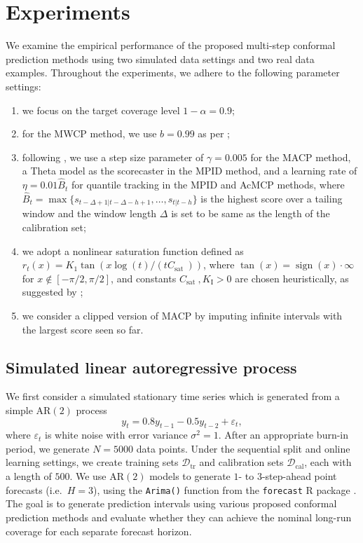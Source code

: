 \documentclass[
  11pt,
  12pt]{article}
\providecommand{\tightlist}{%
  \setlength{\itemsep}{0pt}\setlength{\parskip}{0pt}}\usepackage{longtable,booktabs,array}
\theoremstyle{plain}
\theoremstyle{remark}
\begin{document}
\section{Experiments}\label{experiments}

We examine the empirical performance of the proposed multi-step
conformal prediction methods using two simulated data settings and two
real data examples. Throughout the experiments, we adhere to the
following parameter settings:

\begin{enumerate}
\def\labelenumi{(\alph{enumi})}
\tightlist
\item
  we focus on the target coverage level \(1-\alpha=0.9\);
\item
  for the MWCP method, we use \(b=0.99\) as per \citet{barber2023};
\item
  following \citet{angelopoulos2024}, we use a step size parameter of
  \(\gamma=0.005\) for the MACP method, a Theta model as the scorecaster
  in the MPID method, and a learning rate of \(\eta=0.01\hat{B}_t\) for
  quantile tracking in the MPID and AcMCP methods, where
  \(\hat{B}_t=\max\{s_{t-\Delta+1|t-\Delta-h+1},\dots,s_{t|t-h}\}\) is
  the highest score over a tailing window and the window length
  \(\Delta\) is set to be same as the length of the calibration set;
\item
  we adopt a nonlinear saturation function defined as
  \(r_t(x)=K_1 \tan \left(x \log (t) / (t C_{\text {sat }})\right)\),
  where \(\tan (x)=\operatorname{sign}(x) \cdot \infty\) for
  \(x \notin[-\pi / 2, \pi / 2]\), and constants
  \(C_{\text {sat }}, K_{\mathrm{I}}>0\) are chosen heuristically, as
  suggested by \citet{angelopoulos2024};
\item
  we consider a clipped version of MACP by imputing infinite intervals
  with the largest score seen so far.
\end{enumerate}

\subsection{Simulated linear autoregressive
process}\label{simulated-linear-autoregressive-process}

We first consider a simulated stationary time series which is generated
from a simple AR\((2)\) process \[
y_t = 0.8y_{t-1} - 0.5y_{t-2} + \varepsilon_t,
\] where \(\varepsilon_t\) is white noise with error variance
\(\sigma^2 = 1\). After an appropriate burn-in period, we generate
\(N=5000\) data points. Under the sequential split and online learning
settings, we create training sets \(\mathcal{D}_{\text{tr}}\) and
calibration sets \(\mathcal{D}_{\text{cal}}\), each with a length of
\(500\). We use AR\((2)\) models to generate \(1\)- to \(3\)-step-ahead
point forecasts (i.e.~\(H=3\)), using the \texttt{Arima()} function from
the \texttt{forecast} R package \citep{hyndman2024}. The goal is to
generate prediction intervals using various proposed conformal
prediction methods and evaluate whether they can achieve the nominal
long-run coverage for each separate forecast horizon.
\end{document}
